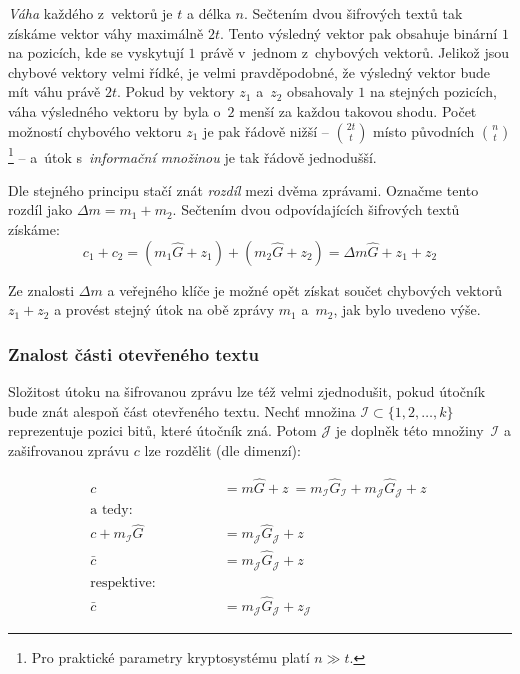 \documentclass[thesis=M,czech,hidelinks]{FITthesis}[2012/06/26]
\newcommand{\0}{{\textcolor[gray]{0.75}{0}}}
\begin{document}
\emph{Váha} každého z~vektorů je $t$ a délka $n$. Sečtením dvou šifrových textů
tak získáme vektor váhy maximálně $2t$. Tento výsledný vektor pak obsahuje
binární $1$ na pozicích, kde se vyskytují $1$ právě v~jednom z~chybových
vektorů. Jelikož jsou chybové vektory velmi řídké, je velmi pravděpodobné, že
výsledný vektor bude mít váhu právě $2t$. Pokud by vektory $z_1$ a~$z_2$
obsahovaly $1$ na stejných pozicích, váha výsledného vektoru by byla o~$2$ menší
za každou takovou shodu. Počet možností chybového vektoru $z_1$ je pak řádově
nižší -- $\binom{2t}{t}$ místo původních $\binom{n}{t}$\footnote{
    Pro praktické parametry kryptosystému platí $n \gg t$.
} -- a~útok s~\emph{informační množinou} je tak řádově jednodušší.

Dle stejného principu stačí znát \emph{rozdíl} mezi dvěma zprávami. Označme
tento rozdíl jako $\Delta m = m_1 + m_2$. Sečtením dvou odpovídajících šifrových
textů získáme:
$$
    c_1 + c_2 = (m_1\hat{G} + z_1) + (m_2\hat{G} + z_2) =
    \Delta m \hat{G} + z_1 + z_2
$$

Ze znalosti $\Delta m$ a veřejného klíče je možné opět získat součet chybových
vektorů $z_1 + z_2 $ a provést stejný útok na obě zprávy $m_1$ a~$m_2$, jak bylo
uvedeno výše.


\subsubsection{Znalost části otevřeného textu}

Složitost útoku na šifrovanou zprávu lze též velmi zjednodušit, pokud útočník
bude znát alespoň část otevřeného textu. Nechť množina $\mathcal{I} \subset
\{1,2,\ldots,k\}$ reprezentuje pozici bitů, které útočník zná. Potom
$\mathcal{J}$ je doplněk této množiny~$\mathcal{I}$ a zašifrovanou zprávu $c$
lze rozdělit (dle dimenzí):

\begin{align*}
    c &= m\hat{G} + z~=
    m_{\mathcal{I}}\hat{G}_{\mathcal{I}} + m_{\mathcal{J}}\hat{G}_{\mathcal{J}} + z~\\
    \text{a tedy:} \qquad \qquad \\
    c + m_{\mathcal{I}}\hat{G} &= m_{\mathcal{J}}\hat{G}_{\mathcal{J}} + z~\\
                       \bar{c} &= m_{\mathcal{J}}\hat{G}_{\mathcal{J}} + z~\\
    \text{respektive:} \qquad \qquad \\
                       \bar{c} &= m_{\mathcal{J}}\hat{G}_{\mathcal{J}} + z_{\mathcal{J}}
\end{align*}
\end{document}
